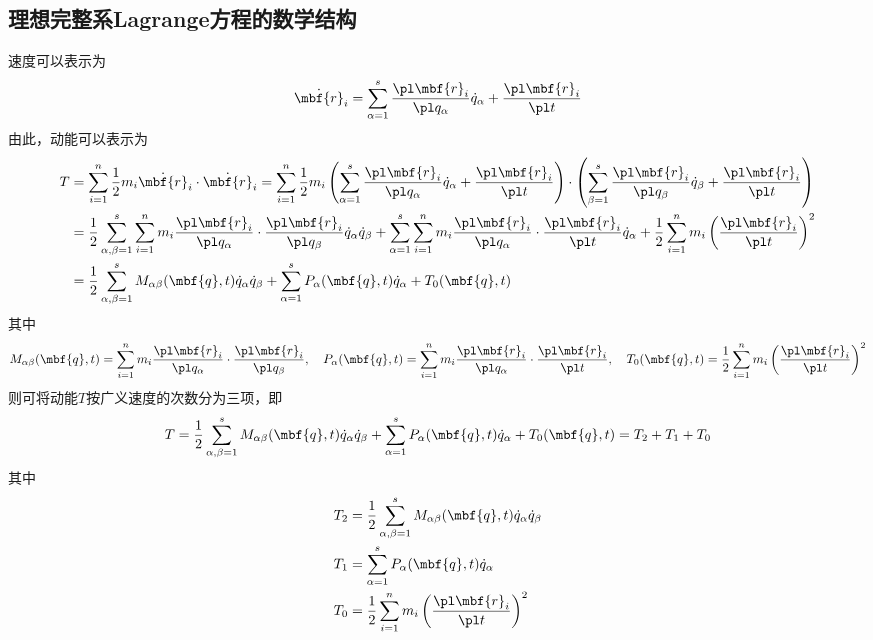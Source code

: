 \subsection{理想完整系Lagrange方程的数学结构}

速度可以表示为
\begin{equation*}
	\dot{\mbf{r}}_i = \sum_{\alpha=1}^s \frac{\pl \mbf{r}_i}{\pl q_\alpha} \dot{q}_\alpha + \frac{\pl \mbf{r}_i}{\pl t}
\end{equation*}
由此，动能可以表示为
\begin{align*}
	T & = \sum_{i=1}^n \frac12 m_i \dot{\mbf{r}}_i \cdot \dot{\mbf{r}}_i = \sum_{i=1}^n \frac12 m_i \left(\sum_{\alpha=1}^s \frac{\pl \mbf{r}_i}{\pl q_\alpha} \dot{q}_\alpha + \frac{\pl \mbf{r}_i}{\pl t}\right) \cdot \left(\sum_{\beta=1}^s \frac{\pl \mbf{r}_i}{\pl q_\beta} \dot{q}_\beta + \frac{\pl \mbf{r}_i}{\pl t}\right) \\
	& = \frac12 \sum_{\alpha,\beta=1}^s \sum_{i=1}^n m_i \frac{\pl \mbf{r}_i}{\pl q_\alpha} \cdot \frac{\pl \mbf{r}_i}{\pl q_\beta} \dot{q}_\alpha \dot{q}_\beta + \sum_{\alpha=1}^s \sum_{i=1}^n m_i \frac{\pl \mbf{r}_i}{\pl q_\alpha} \cdot \frac{\pl \mbf{r}_i}{\pl t} \dot{q}_\alpha + \frac12 \sum_{i=1}^n m_i \left(\frac{\pl \mbf{r}_i}{\pl t}\right)^2 \\
	& = \frac12 \sum_{\alpha,\beta=1}^s M_{\alpha\beta}(\mbf{q},t) \dot{q}_\alpha \dot{q}_\beta + \sum_{\alpha=1}^s P_\alpha(\mbf{q},t) \dot{q}_\alpha + T_0(\mbf{q},t)
\end{align*}
其中
\begin{equation*}
	M_{\alpha\beta}(\mbf{q},t) = \sum_{i=1}^n m_i \frac{\pl \mbf{r}_i}{\pl q_\alpha} \cdot \frac{\pl \mbf{r}_i}{\pl q_\beta},\quad P_\alpha(\mbf{q},t) = \sum_{i=1}^n m_i \frac{\pl \mbf{r}_i}{\pl q_\alpha} \cdot \frac{\pl \mbf{r}_i}{\pl t},\quad T_0(\mbf{q},t) = \frac12 \sum_{i=1}^n m_i \left(\frac{\pl \mbf{r}_i}{\pl t}\right)^2
\end{equation*}
则可将动能$T$按广义速度的次数分为三项，即
\begin{equation}
	T = \frac12 \sum_{\alpha,\beta=1}^s M_{\alpha\beta}(\mbf{q},t) \dot{q}_\alpha \dot{q}_\beta + \sum_{\alpha=1}^s P_\alpha(\mbf{q},t) \dot{q}_\alpha + T_0(\mbf{q},t) = T_2 + T_1 + T_0
	\label{动能的数学结构}
\end{equation}
其中
\begin{align*}
	T_2 & = \frac12 \sum_{\alpha,\beta=1}^s M_{\alpha\beta}(\mbf{q},t) \dot{q}_\alpha \dot{q}_\beta \\
	T_1 & = \sum_{\alpha=1}^s P_\alpha(\mbf{q},t) \dot{q}_\alpha \\
	T_0 & = \frac12 \sum_{i=1}^n m_i \left(\frac{\pl \mbf{r}_i}{\pl t}\right)^2
\end{align*}
